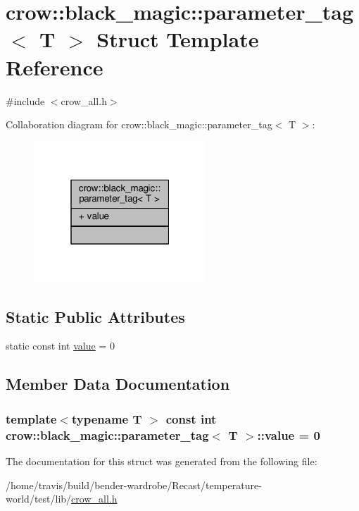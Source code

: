 \hypertarget{structcrow_1_1black__magic_1_1parameter__tag}{\section{crow\-:\-:black\-\_\-magic\-:\-:parameter\-\_\-tag$<$ T $>$ Struct Template Reference}
\label{structcrow_1_1black__magic_1_1parameter__tag}
}


{\ttfamily \#include $<$crow\-\_\-all.\-h$>$}



Collaboration diagram for crow\-:\-:black\-\_\-magic\-:\-:parameter\-\_\-tag$<$ T $>$\-:
\nopagebreak
\begin{figure}[H]
\begin{center}
\leavevmode
\includegraphics[width=184pt]{structcrow_1_1black__magic_1_1parameter__tag__coll__graph}
\end{center}
\end{figure}
\subsection*{Static Public Attributes}
\begin{DoxyCompactItemize}
\item 
static const int \hyperlink{structcrow_1_1black__magic_1_1parameter__tag_abf57b282579f24e0c2ece4976ec752df}{value} = 0
\end{DoxyCompactItemize}


\subsection{Member Data Documentation}
\hypertarget{structcrow_1_1black__magic_1_1parameter__tag_abf57b282579f24e0c2ece4976ec752df}{
\subsubsection[{value}]{\setlength{\rightskip}{0pt plus 5cm}template$<$typename T $>$ const int {\bf crow\-::black\-\_\-magic\-::parameter\-\_\-tag}$<$ T $>$\-::value = 0\hspace{0.3cm}{\ttfamily [static]}}}\label{structcrow_1_1black__magic_1_1parameter__tag_abf57b282579f24e0c2ece4976ec752df}


The documentation for this struct was generated from the following file\-:\begin{DoxyCompactItemize}
\item 
/home/travis/build/bender-\/wardrobe/\-Recast/temperature-\/world/test/lib/\hyperlink{crow__all_8h}{crow\-\_\-all.\-h}\end{DoxyCompactItemize}
